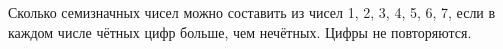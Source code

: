\question
Сколько семизначных чисел можно составить из чисел 1, 2, 3, 4, 5, 6, 7, если в каждом числе чётных цифр больше, чем нечётных. Цифры не повторяются.